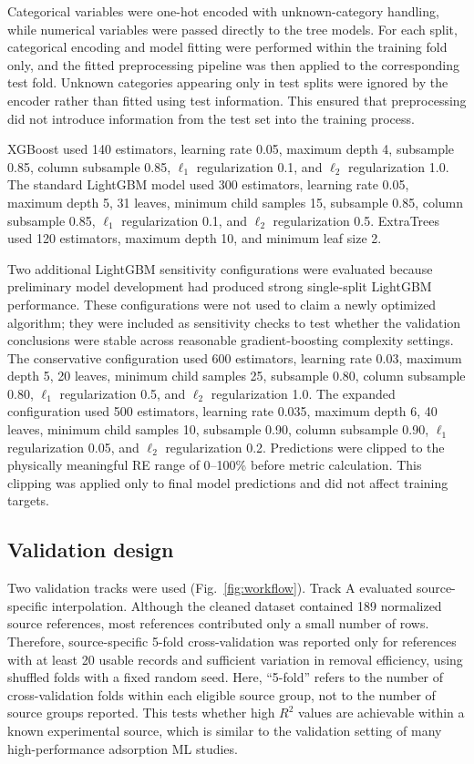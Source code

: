 \documentclass[review,12pt,number]{elsarticle}
\begin{document}
Categorical variables were one-hot encoded with unknown-category handling, while numerical variables were passed directly to the tree models. For each split, categorical encoding and model fitting were performed within the training fold only, and the fitted preprocessing pipeline was then applied to the corresponding test fold. Unknown categories appearing only in test splits were ignored by the encoder rather than fitted using test information. This ensured that preprocessing did not introduce information from the test set into the training process.

XGBoost used 140 estimators, learning rate 0.05, maximum depth 4, subsample 0.85, column subsample 0.85, $\ell_1$ regularization 0.1, and $\ell_2$ regularization 1.0. The standard LightGBM model used 300 estimators, learning rate 0.05, maximum depth 5, 31 leaves, minimum child samples 15, subsample 0.85, column subsample 0.85, $\ell_1$ regularization 0.1, and $\ell_2$ regularization 0.5. ExtraTrees used 120 estimators, maximum depth 10, and minimum leaf size 2.

Two additional LightGBM sensitivity configurations were evaluated because preliminary model development had produced strong single-split LightGBM performance. These configurations were not used to claim a newly optimized algorithm; they were included as sensitivity checks to test whether the validation conclusions were stable across reasonable gradient-boosting complexity settings. The conservative configuration used 600 estimators, learning rate 0.03, maximum depth 5, 20 leaves, minimum child samples 25, subsample 0.80, column subsample 0.80, $\ell_1$ regularization 0.5, and $\ell_2$ regularization 1.0. The expanded configuration used 500 estimators, learning rate 0.035, maximum depth 6, 40 leaves, minimum child samples 10, subsample 0.90, column subsample 0.90, $\ell_1$ regularization 0.05, and $\ell_2$ regularization 0.2. Predictions were clipped to the physically meaningful RE range of 0--100\% before metric calculation. This clipping was applied only to final model predictions and did not affect training targets.

\subsection{Validation design}

Two validation tracks were used (Fig.~\ref{fig:workflow}). Track A evaluated source-specific interpolation. Although the cleaned dataset contained 189 normalized source references, most references contributed only a small number of rows. Therefore, source-specific 5-fold cross-validation was reported only for references with at least 20 usable records and sufficient variation in removal efficiency, using shuffled folds with a fixed random seed. Here, ``5-fold'' refers to the number of cross-validation folds within each eligible source group, not to the number of source groups reported. This tests whether high $R^2$ values are achievable within a known experimental source, which is similar to the validation setting of many high-performance adsorption ML studies.
\end{document}
